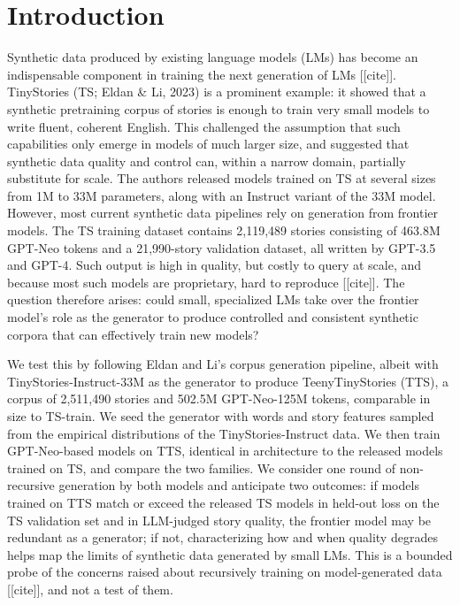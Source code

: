 \documentclass{article}
\begin{document}
\section{Introduction}
Synthetic data produced by existing language models (LMs) has become an indispensable component in training the next generation of LMs [[cite]]. TinyStories (TS; Eldan \& Li, 2023) is a prominent example: it showed that a synthetic pretraining corpus of stories is enough to train very small models to write fluent, coherent English. This challenged the assumption that such capabilities only emerge in models of much larger size, and suggested that synthetic data quality and control can, within a narrow domain, partially substitute for scale. The authors released models trained on TS at several sizes from 1M to 33M parameters, along with an Instruct variant of the 33M model. However, most current synthetic data pipelines rely on generation from frontier models. The TS training dataset contains 2,119,489 stories consisting of 463.8M GPT-Neo tokens and a 21,990-story validation dataset, all written by GPT-3.5 and GPT-4. Such output is high in quality, but costly to query at scale, and because most such models are proprietary, hard to reproduce [[cite]]. The question therefore arises: could small, specialized LMs take over the frontier model’s role as the generator to produce controlled and consistent synthetic corpora that can effectively train new models?

We test this by following Eldan and Li’s corpus generation pipeline, albeit with TinyStories-Instruct-33M as the generator to produce TeenyTinyStories (TTS), a corpus of 2,511,490 stories and 502.5M GPT-Neo-125M tokens, comparable in size to TS-train. We seed the generator with words and story features sampled from the empirical distributions of the TinyStories-Instruct data. We then train GPT-Neo-based models on TTS, identical in architecture to the released models trained on TS, and compare the two families. We consider one round of non-recursive generation by both models and anticipate two outcomes: if models trained on TTS match or exceed the released TS models in held-out loss on the TS validation set and in LLM-judged story quality, the frontier model may be redundant as a generator; if not, characterizing how and when quality degrades helps map the limits of synthetic data generated by small LMs. This is a bounded probe of the concerns raised about recursively training on model-generated data [[cite]], and not a test of them.
\end{document}
